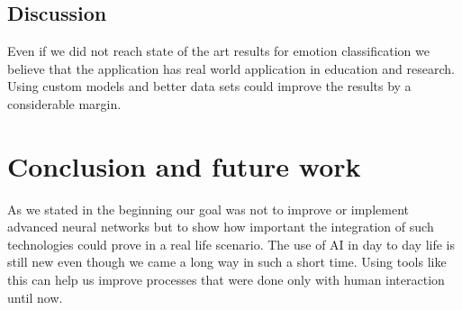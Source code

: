 \documentclass[runningheads,a4paper,11pt]{report}
\begin{document}
\section{Discussion}
\label{section:discussion}

Even if we did not reach state of the art results for emotion classification we believe that the application has real world application in education and research. Using custom models and better data sets could improve the results by a considerable margin. 

\chapter{Conclusion and future work}
\label{chapter:concl}

As we stated in the beginning our goal was not to improve or implement advanced neural networks but to show how important the integration of such technologies could prove in a real life scenario. 
The use of AI in day to day life is still new even though we came a long way in such a short time. Using tools like this can help us improve processes that were done only with human interaction until now.



\end{document}
